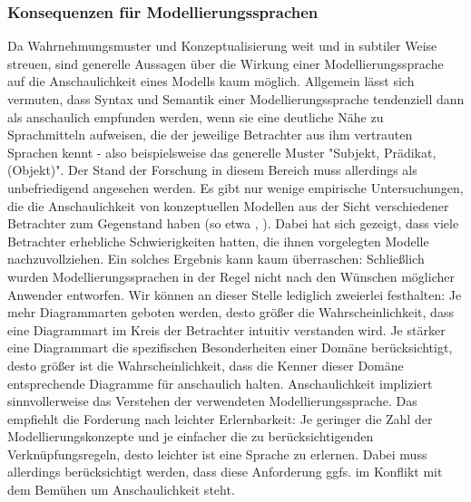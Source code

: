 \subsubsection{Konsequenzen für Modellierungssprachen} 
Da Wahrnehmungsmuster und Konzeptualisierung weit und in subtiler Weise streuen, sind generelle
Aussagen über die Wirkung einer Modellierungssprache auf die Anschaulichkeit eines Modells kaum
möglich. Allgemein lässt sich vermuten, dass Syntax und Semantik einer Modellierungssprache tendenziell
dann als anschaulich empfunden werden, wenn sie eine deutliche Nähe zu Sprachmitteln aufweisen,
die der jeweilige Betrachter aus ihm vertrauten Sprachen kennt - also beispielsweise das generelle
Muster "Subjekt, Prädikat, (Objekt)". Der Stand der Forschung in diesem Bereich muss allerdings als
unbefriedigend angesehen werden. Es gibt nur wenige empirische Untersuchungen, die die Anschaulichkeit
von konzeptuellen Modellen aus der Sicht verschiedener Betrachter zum Gegenstand haben (so
etwa \cite{MT012}, \cite{MT013} ). Dabei hat sich gezeigt, dass viele Betrachter erhebliche Schwierigkeiten hatten,
die ihnen vorgelegten Modelle nachzuvollziehen. Ein solches Ergebnis kann kaum überraschen:
Schließlich wurden Modellierungssprachen in der Regel nicht nach den Wünschen möglicher Anwender entworfen.
Wir können an dieser Stelle lediglich zweierlei festhalten: Je mehr Diagrammarten geboten
werden, desto größer die Wahrscheinlichkeit, dass eine Diagrammart im Kreis der Betrachter intuitiv
verstanden wird. Je stärker eine Diagrammart die spezifischen Besonderheiten einer Domäne berücksichtigt,
desto größer ist die Wahrscheinlichkeit, dass die Kenner dieser Domäne entsprechende Diagramme
für anschaulich halten. Anschaulichkeit impliziert sinnvollerweise das Verstehen der verwendeten
Modellierungssprache. Das empfiehlt die Forderung nach leichter Erlernbarkeit: Je geringer die
Zahl der Modellierungskonzepte und je einfacher die zu berücksichtigenden Verknüpfungsregeln,
desto leichter ist eine Sprache zu erlernen. Dabei muss allerdings berücksichtigt werden, dass diese
Anforderung ggfs. im Konflikt mit dem Bemühen um Anschaulichkeit steht.\cite{MT010} \\
